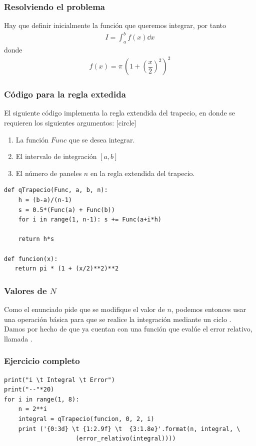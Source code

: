 \begin{frame}
\frametitle{Resolviendo el problema}
Hay que definir inicialmente la función que queremos integrar, por tanto
\begin{align*}
I = \int_{a}^{b} f(x) \dd{x}
\end{align*}
donde
\begin{align*}
f(x) = \pi \, \left( 1 + \left( \dfrac{x}{2} \right)^{2} \right)^{2}
\end{align*}
\end{frame}
\begin{frame}
\frametitle{Código para la regla extedida}
El siguiente código implementa la regla extendida del trapecio, en donde se requieren los siguientes argumentos:
[circle]
\begin{enumerate}[<+->]
\item La función $Func$ que se desea integrar.
\item El intervalo de integración $[a, b]$
\item El número de paneles $n$ en la regla extendida del trapecio.
\end{enumerate}
\end{frame}
\begin{frame}
\begin{lstlisting}[caption=Código para el método del trapecio, style=FormattedNumber, basicstyle=\linespread{1.1}\ttfamily=\small, columns=fullflexible]
def qTrapecio(Func, a, b, n):
    h = (b-a)/(n-1)
    s = 0.5*(Func(a) + Func(b))
    for i in range(1, n-1): s += Func(a+i*h)

    return h*s

def funcion(x):
   return pi * (1 + (x/2)**2)**2
\end{lstlisting}
\end{frame}
\begin{frame}
\frametitle{Valores de $N$}
Como el enunciado pide que se modifique el valor de $n$, podemos entonces usar una operación básica para que se realice la integración mediante un ciclo .
\\
\bigskip
Damos por hecho de que ya cuentan con una función que evalúe el error relativo, llamada .
\end{frame}
\begin{frame}[fragile]
\frametitle{Ejercicio completo}
\begin{lstlisting}[caption=Completamos el código y evaluamos el error, style=FormattedNumber, basicstyle=\linespread{1.1}\ttfamily=\small, columns=fullflexible]
print("i \t Integral \t Error")
print("--"*20)
for i in range(1, 8):
    n = 2**i
    integral = qTrapecio(funcion, 0, 2, i)
    print ('{0:3d} \t {1:2.9f} \t  {3:1.8e}'.format(n, integral, \
                    (error_relativo(integral))))
\end{lstlisting}
\end{frame}
